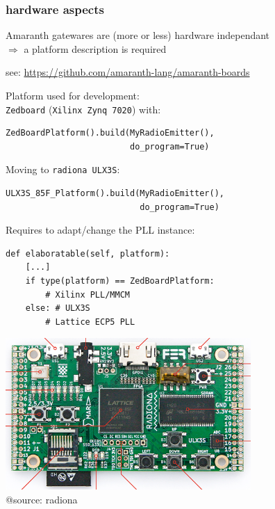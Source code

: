 \documentclass[compress,10pt,aspectratio=169]{beamer}
\begin{document}
\begin{frame}\frametitle{hardware aspects}

Amaranth gatewares are (more or less) hardware independant\\
$\Rightarrow$ a platform description is required

see: \url{https://github.com/amaranth-lang/amaranth-boards}

\begin{minipage}[t]{\linewidth}
\begin{minipage}{.5\linewidth}
Platform used for development: \\
{\tt Zedboard} ({\tt Xilinx Zynq 7020}) with:
{\footnotesize
\begin{verbatim}
ZedBoardPlatform().build(MyRadioEmitter(),
                         do_program=True)
\end{verbatim}
}

Moving to {\tt radiona ULX3S}:
{\footnotesize
\begin{verbatim}
ULX3S_85F_Platform().build(MyRadioEmitter(),
                           do_program=True)
\end{verbatim}
}

Requires to adapt/change the PLL instance:
{\footnotesize
\begin{verbatim}
def elaboratable(self, platform):
    [...]
    if type(platform) == ZedBoardPlatform:
        # Xilinx PLL/MMCM
    else: # ULX3S
        # Lattice ECP5 PLL
\end{verbatim}
}
\end{minipage}
\begin{minipage}{.5\linewidth}
\center
\includegraphics[width=0.7\textwidth]{./ulx3s-legend.png}\\
@source: radiona
\end{minipage}
\end{minipage}

\end{frame}
\end{document}
